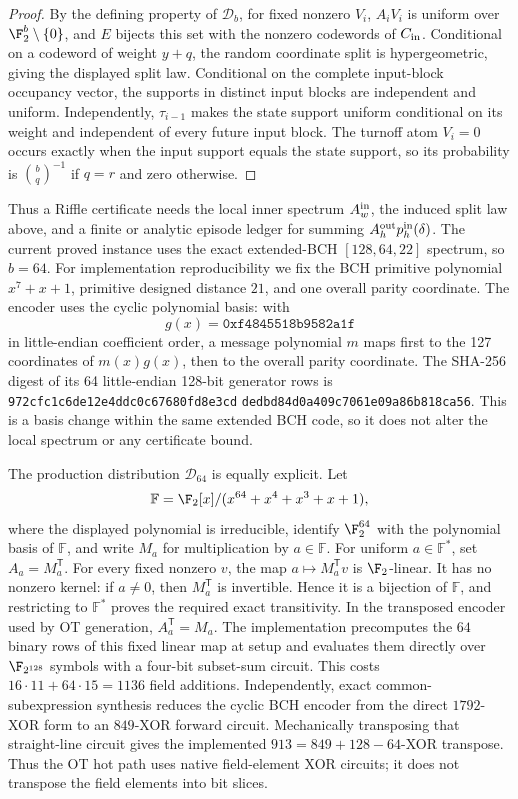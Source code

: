 \begin{proof}
By the defining property of \(\mathcal D_b\), for fixed nonzero \(V_i\),
\(A_iV_i\) is uniform over
\(\F_2^b\setminus\{0\}\), and \(E\) bijects this set with the nonzero codewords
of \(C_{\rm in}\).  Conditional on a codeword of weight \(y+q\), the random
coordinate split is hypergeometric, giving the displayed split law.
Conditional on the complete input-block occupancy vector, the supports in
distinct input blocks are independent and uniform.  Independently,
\(\tau_{i-1}\) makes the state support uniform conditional on its weight and
independent of every future input block.  The turnoff atom \(V_i=0\) occurs
exactly when the input support equals the state support, so its probability is
\(\binom{b}{q}^{-1}\) if \(q=r\) and zero otherwise.
\end{proof}

Thus a Riffle certificate needs the local inner spectrum \(A_w^{\rm in}\),
the induced split law above, and a finite or analytic episode ledger for
summing \(A_h^{\rm out}p_h^{\rm in}(\delta)\).  The current proved instance
uses the exact extended-BCH \([128,64,22]\) spectrum, so \(b=64\).
For implementation reproducibility we fix the BCH primitive polynomial
\(x^7+x+1\), primitive designed distance \(21\), and one overall parity
coordinate.  The encoder uses the cyclic polynomial basis: with
\[
 g(x)=\texttt{0xf4845518b9582a1f}
\]
in little-endian coefficient order, a message polynomial \(m\) maps first to
the 127 coordinates of \(m(x)g(x)\), then to the overall parity coordinate.
The SHA-256 digest of its 64 little-endian 128-bit generator rows is
\texttt{972cfc1c6de12e4ddc0c67680fd8e3cd}\allowbreak
\texttt{dedbd84d0a409c7061e09a86b818ca56}.
This is a basis change within the same extended BCH code, so it does not alter
the local spectrum or any certificate bound.

The production distribution \(\mathcal D_{64}\) is equally explicit.  Let
\[
 \mathbb F=\F_2[x]/(x^{64}+x^4+x^3+x+1),
\]
where the displayed polynomial is irreducible, identify \(\F_2^{64}\) with
the polynomial basis of \(\mathbb F\), and write \(M_a\) for multiplication
by \(a\in\mathbb F\).  For uniform \(a\in\mathbb F^*\), set
\(A_a=M_a^{\mathsf T}\).  For every fixed nonzero \(v\), the map
\(a\mapsto M_a^{\mathsf T}v\) is \(\F_2\)-linear.  It has no nonzero kernel:
if \(a\ne0\), then \(M_a^{\mathsf T}\) is invertible.  Hence it is a
bijection of \(\mathbb F\), and restricting to \(\mathbb F^*\) proves the
required exact transitivity.  In the transposed encoder used by OT generation,
\(A_a^{\mathsf T}=M_a\).  The implementation precomputes the \(64\) binary
rows of this fixed linear map at setup and evaluates them directly over
\(\F_{2^{128}}\) symbols with a four-bit subset-sum circuit.  This costs
\(16\cdot11+64\cdot15=1136\) field additions.  Independently, exact
common-subexpression synthesis reduces the cyclic BCH encoder from the direct
\(1792\)-XOR form to an \(849\)-XOR forward circuit.  Mechanically transposing
that straight-line circuit gives the implemented \(913=849+128-64\)-XOR
transpose.  Thus the OT hot path uses native
field-element XOR circuits; it does
not transpose the field elements into bit slices.
